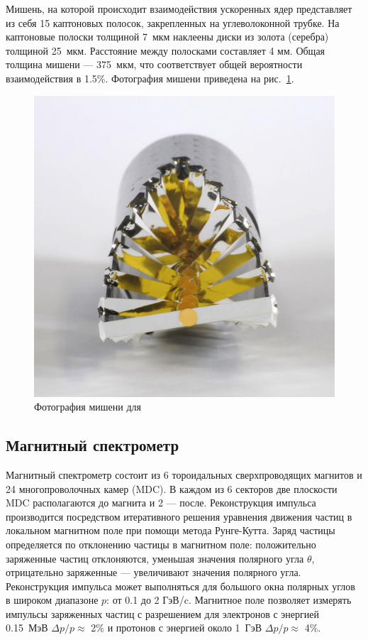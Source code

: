 Мишень, на которой происходит взаимодействия ускоренных ядер представляет из себя 15 каптоновых полосок, закрепленных на углеволоконной трубке.
На каптоновые полоски толщиной 7~мкм наклеены диски из золота (серебра) толщиной 25~мкм.
Расстояние между полосками составляет 4 мм. 
Общая толщина мишени --- 375~мкм, что соответствует общей вероятности взаимодействия в 1.5\%.
Фотография мишени приведена на рис.~\ref{fig:hades_target}. 
%
\begin{figure}[ht]
\begin{center}
\includegraphics[width=0.75\linewidth]{images/hades_target.jpg}
\caption{ Фотография мишени для  }
\label{fig:hades_target}
\end{center}
\end{figure}

\subsection{ Магнитный спектрометр }

Магнитный спектрометр состоит из 6 тороидальных сверхпроводящих магнитов и 24 многопроволочных камер (MDC).
В каждом из 6 секторов две плоскости MDC располагаются до магнита и 2 --- после. 
Реконструкция импульса производится посредством итеративного решения уравнения движения частиц в локальном магнитном поле при помощи метода Рунге-Кутта.
Заряд частицы определяется по отклонению частицы в магнитном поле: положительно заряженные частиц отклоняются, уменьшая значения полярного угла $\theta$, отрицательно заряженные --- увеличивают значения полярного угла.
Реконструкция импульса может выполняться для большого окна полярных углов в широком диапазоне $p$: от 0.1 до 2 ГэВ/c.
Магнитное поле позволяет измерять импульсы заряженных частиц с разрешением для электронов с энергией 0.15~МэВ $\Delta p/p \approx$ 2\% и протонов с энергией около 1~ГэВ $\Delta p/p \approx$ 4\%.  

